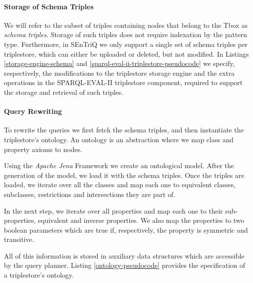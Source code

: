 \paragraph{Storage of Schema Triples} We will refer to the subset of triples containing nodes that belong to the Tbox as \emph{schema triples}. Storage of such triples does not require indexation by the pattern type. Furthermore, in \gls{SEnTriQ} we only support a single set of schema triples per triplestore, which can either be uploaded or deleted, but not modified. In Listings \ref{storage-engine-schema} and \ref{sparql-eval-ii-triplestore-pseudocode} we specify, respectively, the modifications to the triplestore storage engine and the extra operations in the SPARQL-EVAL-II triplestore component, required to support the storage and retrieval of such triples.

%

%

\paragraph{Query Rewriting} To rewrite the queries we first fetch the schema triples, and then instantiate the triplestore's ontology. An ontology is an abstraction where we map class and property axioms to nodes.

Using the \emph{Apache Jena} Framework \autocite{The_Apache_Software_Foundation_undated-wk} we create an ontological model. After the generation of the model, we load it with the schema triples. Once the triples are loaded, we iterate over all the classes and map each one to equivalent classes, subclasses, restrictions and intersections they are part of.

In the next step, we iterate over all properties and map each one to their sub-properties, equivalent and inverse properties. We also map the properties to two boolean parameters which are true if, respectively, the property is symmetric and transitive.

All of this information is stored in auxiliary data structures which are accessible by the query planner. Listing \ref{ontology-pseudocode} provides the specification of a triplestore's ontology.

